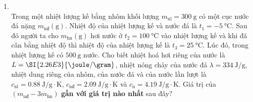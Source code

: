 \begin{enumerate}[label=\bfseries Câu \arabic*:, leftmargin=1.7cm]
{	}

\item {}\\
Trong một nhiệt lượng kế bằng nhôm khối lượng $m_\text{nl}=\SI{300}{\gram}$ có một cục nước đá nặng $m_\text{nđ}\left(\si{\gram}\right)$. Nhiệt độ của nhiệt lượng kế và nước đá là $t_1=\SI{-5}{\celsius}$. Sau đó người ta cho $m_\text{hn}\left(\si{\gram}\right)$ hơi nước ở $t_2=\SI{100}{\celsius}$ vào nhiệt lượng kế và khi đã cân bằng nhiệt độ thì nhiệt độ của nhiệt lượng kế là $t_3=\SI{25}{\celsius}$. Lúc đó, trong nhiệt lượng kế có $\SI{500}{\gram}$ nước. Cho biết nhiệt hoá hơi riêng của nước là $L=\SI{2.26E3}{\joule/\gram}$, nhiệt nóng chảy của nước đá $\lambda=\SI{334}{\joule/\gram}$, nhiệt dung riêng của nhôm, của nước đá và của nước lần lượt là $c_\text{nl}=\SI{0.88}{\joule/\gram\cdot\kelvin}$, $c_\text{nđ}=\SI{2.09}{\joule/\gram\cdot\kelvin}$ và $c_\text{n}=\SI{4.19}{\joule/\gram\cdot\kelvin}$. Giá trị của $\left(m_\text{nđ}-3m_\text{hn}\right)$ \textbf{gần với giá trị nào nhất} sau đây?
\end{enumerate}

